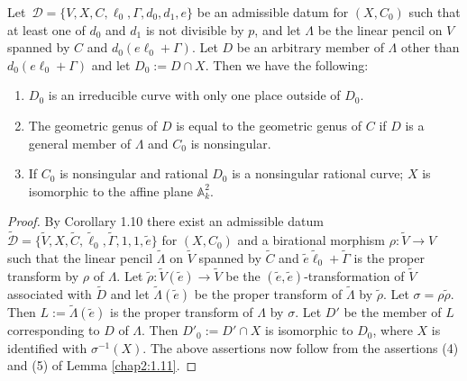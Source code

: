 \begin{theorem*}
Let\pageoriginale\
$\mathscr{D}=\{V,X,C,\ell_{0},\Gamma,d_{0},d_{1},e\}$ be an admissible
datum for $(X,C_{0})$ such that at least one of $d_{0}$ and $d_{1}$ is
not divisible by $p$, and let $\Lambda$ be the linear pencil on $V$
spanned by $C$ and $d_{0}(e\ell_{0}+\Gamma)$. Let $D$ be an arbitrary
member of $\Lambda$ other than $d_{0}(e\ell_{0}+\Gamma)$ and let
$D_{0}:=D\cap X$. Then we have the following:
\begin{enumerate}
\renewcommand{\labelenumi}{\rm(\theenumi)}
\item $D_{0}$ is an irreducible curve with only one place outside of
  $D_{0}$.

\item The geometric genus of $D$ is equal to the geometric genus of
  $C$ if $D$ is a general member of $\Lambda$ and $C_{0}$ is
  nonsingular.

\item If $C_{0}$ is nonsingular and rational $D_{0}$ is a nonsingular
  rational curve; $X$ is isomorphic to the affine plane
  $\mathbb{A}^{2}_{k}$.
\end{enumerate}
\end{theorem*}

\begin{proof}
By Corollary 1.10 there exist an admissible datum\break
$\widetilde{\mathscr{D}}=\{\widetilde{V},X,\widetilde{C},\widetilde{\ell}_{0},\widetilde{\Gamma},1,1,\widetilde{e}\}$
for $(X,C_{0})$ and a birational morphism $\rho:\widetilde{V}\to V$
such that the linear pencil $\widetilde{\Lambda}$ on $\widetilde{V}$
spanned by $\widetilde{C}$ and
$\widetilde{e}\widetilde{\ell}_{0}+\widetilde{\Gamma}$ is the proper
transform by $\rho$ of $\Lambda$. Let
$\widetilde{\rho}:\widetilde{V}(\widetilde{e})\to \widetilde{V}$ be
the $(\widetilde{e},\widetilde{e})$-transformation of $\widetilde{V}$
associated with $\widetilde{D}$ and let
$\widetilde{\Lambda}(\widetilde{e})$ be the proper transform of
$\widetilde{\Lambda}$ by $\widetilde{\rho}$. Let
$\sigma=\rho\widetilde{\rho}$. Then
$L:=\widetilde{\Lambda}(\widetilde{e})$ is the proper transform of
$\Lambda$ by $\sigma$. Let $D'$ be the member of $L$ corresponding to
$D$ of $\Lambda$. Then $D'_{0}:=D'\cap X$ is isomorphic to $D_{0}$,
where $X$ is identified with $\sigma^{-1}(X)$. The above assertions
now follow from the assertions (4) and (5) of Lemma
\ref{chap2:1.11}.
\end{proof}


